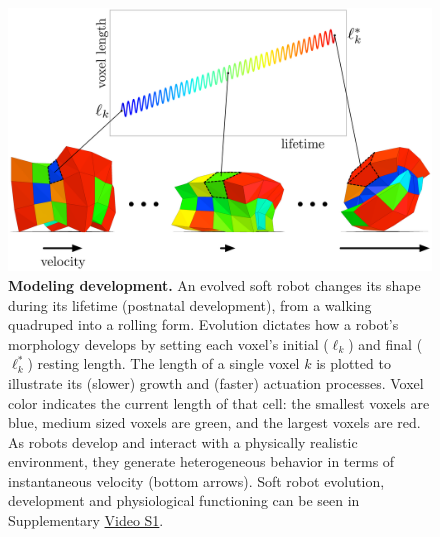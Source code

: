 

\begin{figure}[t]
\centering
\includegraphics[width=0.8\linewidth]{Chapter04/Fig1}
\caption{\label{fig:blueprint}\textbf{Modeling development.} An evolved soft robot changes its shape during its lifetime (postnatal development), from a walking quadruped into a rolling form. 
Evolution dictates how a robot's morphology develops by setting each voxel's initial ($\ell_k$) and final ($\ell^*_k$) resting length.
The length of a single voxel $k$ is plotted to illustrate its (slower) growth and (faster) actuation processes.
Voxel color indicates the current length of that cell: the smallest voxels are blue, medium sized voxels are green, and the largest voxels are red.
As robots develop and interact with a physically realistic environment, they generate heterogeneous behavior in terms of instantaneous velocity (bottom arrows).
Soft robot evolution, development and physiological functioning can be seen in Supplementary \href{https://youtu.be/Ee2sU-AZWC4}{Video S1}.
}
\end{figure}

